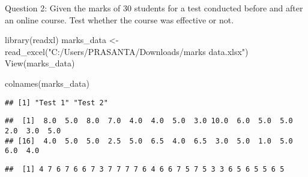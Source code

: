 \documentclass[
]{article}
\newenvironment{Shaded}{\begin{snugshade}}{\end{snugshade}}
\newcommand{\AttributeTok}[1]{\textcolor[rgb]{0.77,0.63,0.00}{#1}}
\newcommand{\FunctionTok}[1]{\textcolor[rgb]{0.00,0.00,0.00}{#1}}
\newcommand{\NormalTok}[1]{#1}
\newcommand{\OtherTok}[1]{\textcolor[rgb]{0.56,0.35,0.01}{#1}}
\newcommand{\SpecialCharTok}[1]{\textcolor[rgb]{0.00,0.00,0.00}{#1}}
\newcommand{\StringTok}[1]{\textcolor[rgb]{0.31,0.60,0.02}{#1}}
\begin{document}
Question 2: Given the marks of 30 students for a test conducted before
and after an online course. Test whether the course was effective or
not.

\begin{Shaded}
\begin{Highlighting}[]
\FunctionTok{library}\NormalTok{(readxl)}
\NormalTok{marks\_data }\OtherTok{\textless{}{-}} \FunctionTok{read\_excel}\NormalTok{(}\StringTok{"C:/Users/PRASANTA/Downloads/marks data.xlsx"}\NormalTok{)}
\FunctionTok{View}\NormalTok{(marks\_data)}
\end{Highlighting}
\end{Shaded}

\begin{Shaded}
\begin{Highlighting}[]
\FunctionTok{colnames}\NormalTok{(marks\_data)}
\end{Highlighting}
\end{Shaded}

\begin{verbatim}
## [1] "Test 1" "Test 2"
\end{verbatim}

\begin{Shaded}
\end{Shaded}

\begin{verbatim}
##  [1]  8.0  5.0  8.0  7.0  4.0  4.0  5.0  3.0 10.0  6.0  5.0  5.0  2.0  3.0  5.0
## [16]  4.0  5.0  5.0  2.5  5.0  6.5  4.0  6.5  3.0  5.0  1.0  5.0  6.0  4.0
\end{verbatim}

\begin{Shaded}
\end{Shaded}

\begin{verbatim}
##  [1] 4 7 6 7 6 6 7 3 7 7 7 7 6 4 6 6 7 5 7 5 3 3 6 5 6 5 5 6 5
\end{verbatim}
\end{document}
